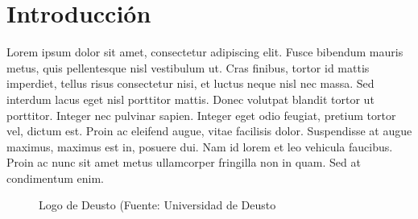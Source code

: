 \chapter{Introducción}\label{Int}

\thispagestyle{fancy}


Lorem ipsum dolor sit amet, consectetur adipiscing elit. Fusce bibendum mauris metus, quis pellentesque nisl vestibulum ut. Cras finibus, tortor id mattis imperdiet, tellus risus consectetur nisi, et luctus neque nisl nec massa. Sed interdum lacus eget nisl porttitor mattis. Donec volutpat blandit tortor ut porttitor. Integer nec pulvinar sapien. Integer eget odio feugiat, pretium tortor vel, dictum est. Proin ac eleifend augue, vitae facilisis dolor. Suspendisse at augue maximus, maximus est in, posuere dui. Nam id lorem et leo vehicula faucibus. Proin ac nunc sit amet metus ullamcorper fringilla non in quam. Sed at condimentum enim.\\

\setlength{\fboxsep}{5pt}
\begin{figure}[thbp]
\centering
{}
\caption{Logo de Deusto (Fuente: Universidad de Deusto \cite{Deusto}} \label{fig:Deusto}
\end{figure}


